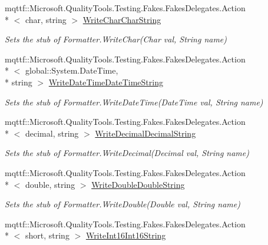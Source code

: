 \begin{DoxyCompactItemize}
mqttf\-::\-Microsoft.\-Quality\-Tools.\-Testing.\-Fakes.\-Fakes\-Delegates.\-Action\\*
$<$ char, string $>$ \hyperlink{class_system_1_1_runtime_1_1_serialization_1_1_fakes_1_1_stub_formatter_accd64b66ad924cadec51fa9cb8a23504}{Write\-Char\-Char\-String}
\begin{DoxyCompactList}\small\item\em Sets the stub of Formatter.\-Write\-Char(\-Char val, String name)\end{DoxyCompactList}\item 
mqttf\-::\-Microsoft.\-Quality\-Tools.\-Testing.\-Fakes.\-Fakes\-Delegates.\-Action\\*
$<$ global\-::\-System.\-Date\-Time, \\*
string $>$ \hyperlink{class_system_1_1_runtime_1_1_serialization_1_1_fakes_1_1_stub_formatter_a3240f920d67253cbee7a67582bafc9b9}{Write\-Date\-Time\-Date\-Time\-String}
\begin{DoxyCompactList}\small\item\em Sets the stub of Formatter.\-Write\-Date\-Time(\-Date\-Time val, String name)\end{DoxyCompactList}\item 
mqttf\-::\-Microsoft.\-Quality\-Tools.\-Testing.\-Fakes.\-Fakes\-Delegates.\-Action\\*
$<$ decimal, string $>$ \hyperlink{class_system_1_1_runtime_1_1_serialization_1_1_fakes_1_1_stub_formatter_a680e6810590f089ed7332142cf39ee36}{Write\-Decimal\-Decimal\-String}
\begin{DoxyCompactList}\small\item\em Sets the stub of Formatter.\-Write\-Decimal(\-Decimal val, String name)\end{DoxyCompactList}\item 
mqttf\-::\-Microsoft.\-Quality\-Tools.\-Testing.\-Fakes.\-Fakes\-Delegates.\-Action\\*
$<$ double, string $>$ \hyperlink{class_system_1_1_runtime_1_1_serialization_1_1_fakes_1_1_stub_formatter_a347bddee74ac70c15d43943c6580fd29}{Write\-Double\-Double\-String}
\begin{DoxyCompactList}\small\item\em Sets the stub of Formatter.\-Write\-Double(\-Double val, String name)\end{DoxyCompactList}\item 
mqttf\-::\-Microsoft.\-Quality\-Tools.\-Testing.\-Fakes.\-Fakes\-Delegates.\-Action\\*
$<$ short, string $>$ \hyperlink{class_system_1_1_runtime_1_1_serialization_1_1_fakes_1_1_stub_formatter_a4bfb31cd67b4184473ef7877f3af5a29}{Write\-Int16\-Int16\-String}

\end{DoxyCompactItemize}
